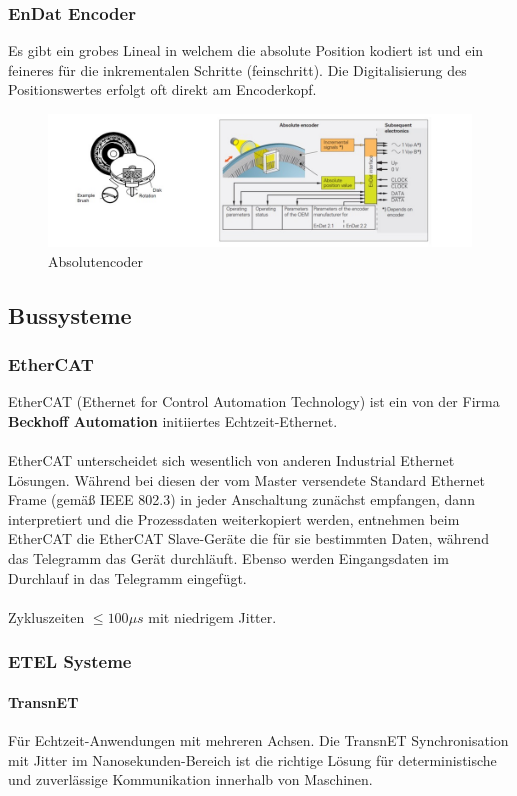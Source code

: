 		\subsubsection{EnDat Encoder}
			Es gibt ein grobes Lineal in welchem die absolute Position kodiert ist und ein feineres für die inkrementalen Schritte (feinschritt). Die Digitalisierung des Positionswertes erfolgt oft direkt am Encoderkopf.
			\begin{figure}
				\centering
				\includegraphics[width=\linewidth]{./pics/endat}
				\caption{Absolutencoder}
			\end{figure}
	\subsection{Bussysteme}
		\subsubsection{EtherCAT}
			EtherCAT (Ethernet for Control Automation Technology) ist ein von der Firma \textbf{Beckhoff Automation} initiiertes Echtzeit-Ethernet.\\\\
			EtherCAT unterscheidet sich wesentlich von anderen Industrial Ethernet Lösungen. Während bei diesen der vom Master versendete Standard Ethernet Frame (gemäß IEEE 802.3) in jeder Anschaltung zunächst empfangen, dann interpretiert und die Prozessdaten weiterkopiert werden, entnehmen beim EtherCAT die EtherCAT Slave-Geräte die für sie bestimmten Daten, während das Telegramm das Gerät durchläuft. Ebenso werden Eingangsdaten im Durchlauf in das Telegramm eingefügt.\\\\
			Zykluszeiten $ \leq 100 \mu s $ mit niedrigem Jitter.
		\subsubsection{ETEL Systeme}
			\paragraph{TransnET}
				Für Echtzeit-Anwendungen mit mehreren Achsen. Die TransnET Synchronisation mit Jitter im Nanosekunden-Bereich ist die richtige Lösung für deterministische und zuverlässige Kommunikation innerhalb von Maschinen.
